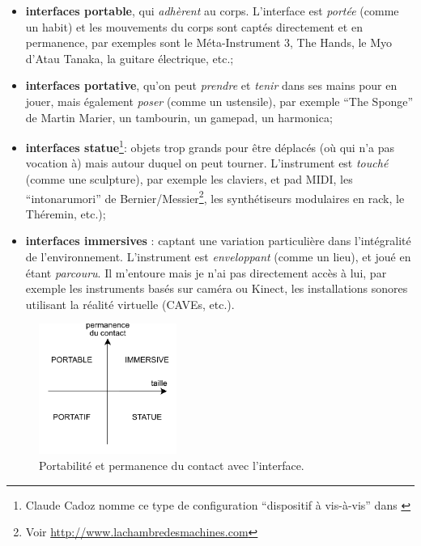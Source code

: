 \vspace{-1em}
\begin{itemize}[noitemsep]
	\item \textbf{interfaces portable}, qui \textit{adhèrent} au corps. L'interface est \textit{portée} (comme un habit) et les mouvements du corps sont captés directement et en permanence, par exemples sont le Méta-Instrument 3, The Hands, le Myo d'Atau Tanaka, la guitare électrique, etc.;
	\item \textbf{interfaces portative}, qu'on peut \textit{prendre} et \textit{tenir} dans ses mains pour en jouer, mais également \textit{poser} (comme un ustensile), par exemple ``The Sponge'' de Martin Marier, un tambourin, un gamepad, un harmonica;
	\item \textbf{interfaces statue}\footnote{Claude Cadoz nomme ce type de configuration ``dispositif à vis-à-vis'' dans \cite{cadoz_geste_1994}}: objets trop grands pour être déplacés (où qui n'a pas vocation à) mais autour duquel on peut tourner. L'instrument est \textit{touché} (comme une sculpture), par exemple les claviers, et pad \gls{MIDI}, les ``intonarumori'' de Bernier/Messier\footnote{Voir \url{http://www.lachambredesmachines.com}}, les synthétiseurs modulaires en rack, le Théremin, etc.);
	\item \textbf{interfaces immersives} : captant une variation particulière dans l'intégralité de l'environnement. L'instrument est \textit{enveloppant} (comme un lieu), et joué en étant \textit{parcouru}. Il m'entoure mais je n'ai pas directement accès à lui, par exemple les instruments basés sur caméra ou Kinect, les installations sonores utilisant la réalité virtuelle (CAVEs, etc.).
\end{itemize}
\clearpage
\begin{figure}
	\vspace{-1em}
	\captionsetup{format=plain}
	\centering
 	\includegraphics[width=0.4\textwidth]{gfx/05_interfaces/interface-portabilite.pdf}
	\caption[Portabilité et permanence du contact avec l'interface.]{Portabilité et permanence du contact avec l'interface.}
 	\label{fig:interfaces:portabilite}
\end{figure}

